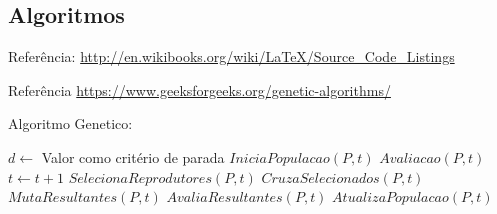 \subsection{Algoritmos}\label{sec:Algoritmos}
Referência: \url{http://en.wikibooks.org/wiki/LaTeX/Source_Code_Listings}



Referência \url{https://www.geeksforgeeks.org/genetic-algorithms/}

\begin{algorithm}
	\caption{Algoritmo Genetico:}
	\label{alg:algoritmogenetico}
	\begin{algorithmic}[1]
		\STATE $d \leftarrow$ Valor como critério de parada
		\STATE $IniciaPopulacao(P, t)$
		\STATE $Avaliacao(P, t)$
		\STATE $t \leftarrow t + 1$
		\STATE $SelecionaReprodutores(P, t)$
		\STATE $CruzaSelecionados(P, t)$
		\STATE $MutaResultantes(P, t)$
		\STATE $AvaliaResultantes(P, t)$
		\STATE $AtualizaPopulacao(P, t)$
		\ENDWHILE
	\end{algorithmic}
\end{algorithm}

